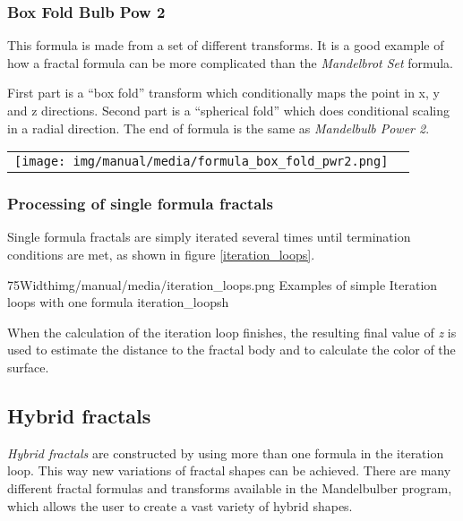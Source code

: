 \subsubsection{Box Fold Bulb Pow 2}

This formula is made from a set of different transforms. It is a good example of
how a fractal formula can be more complicated than the
\emph{Mandelbrot Set} formula.

First part is a ``box fold'' transform which conditionally maps the point in x, y and z directions. Second part is a ``spherical fold'' which does conditional scaling in a radial direction.
The end of formula is the same as \emph{Mandelbulb Power 2}.

\begin{tabular}{l l}
	\texttt{[image: img/manual/media/formula\_box\_fold\_pwr2.png]}	
	& 
	\begin{minipage}[b]{0.5\linewidth}
		
	\end{minipage}
\end{tabular} 

\subsubsection{Processing of single formula fractals}

Single formula fractals are simply iterated several times until termination conditions are met, as shown in figure \ref{iteration_loops}. \nolinebreak \nopagebreak

\simpleImageWithCaption75Width{img/manual/media/iteration_loops.png}
{Examples of simple Iteration loops with one formula}
{iteration_loops}{h}

When the calculation of the iteration loop finishes, the resulting final value of \emph{z} is
used to estimate the distance to the fractal body and to calculate the color of the surface.

\subsection{Hybrid fractals}

\emph{Hybrid fractals} are constructed by using more than one formula in the iteration loop.
This way new variations of fractal shapes can be achieved. There are many different fractal formulas and transforms available in the Mandelbulber program, which allows the user to create a vast variety of hybrid shapes.

